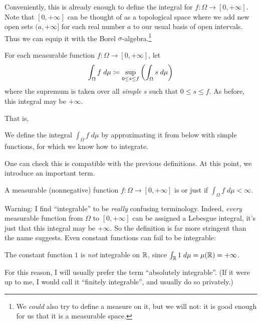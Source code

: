 Conveniently, this is already enough to define the integral
for $f \colon \Omega \to [0, +\infty]$.
Note that $[0,+\infty]$ can be thought of as a topological space
where we add new open sets $(a,+\infty]$ %
for each real number $a$ to our usual basis of open intervals.
Thus we can equip it with the Borel $\sigma$-algebra.\footnote{We
	\emph{could} also try to define a measure on it,
	but we will not: it is good enough for us
	that it is a measurable space.}
\begin{step}
	For each measurable function $f \colon \Omega \to [0, +\infty]$, let
	\[ \int_\Omega f \; d\mu \coloneqq
		\sup_{0 \le s \le f} \left( \int_\Omega s \; d\mu \right) \]
	where the supremum is taken over all \emph{simple} $s$
	such that $0 \le s \le f$.
	As before, this integral may be $+\infty$.
\end{step}

That is,
\begin{moral}
	We define the integral $\int_\Omega f \; d\mu$ by approximating it from below with simple functions,
	for which we know how to integrate.
\end{moral}

One can check this is compatible with the previous definitions.
At this point, we introduce an important term.
\begin{definition}
	A measurable (nonnegative) function $f \colon \Omega \to [0, +\infty]$
	is 
	or just  if $\int_\Omega f \; d\mu < \infty$.
\end{definition}
Warning: I find ``integrable'' to be \emph{really} confusing terminology.
Indeed, \emph{every} measurable function from $\Omega$ to $[0,+\infty]$
can be assigned a Lebesgue integral, it's just that
this integral may be $+\infty$.
So the definition is far more stringent than the name suggests.
Even constant functions can fail to be integrable:
\begin{example}
	The constant function $1$ is \emph{not} integrable on $\mathbb R$,
	since $\int_\mathbb R 1 \; d\mu = \mu(\mathbb R) = +\infty$.
\end{example}
For this reason, I will usually prefer the term ``absolutely integrable''.
(If it were up to me, I would call it ``finitely integrable'',
and usually do so privately.)


